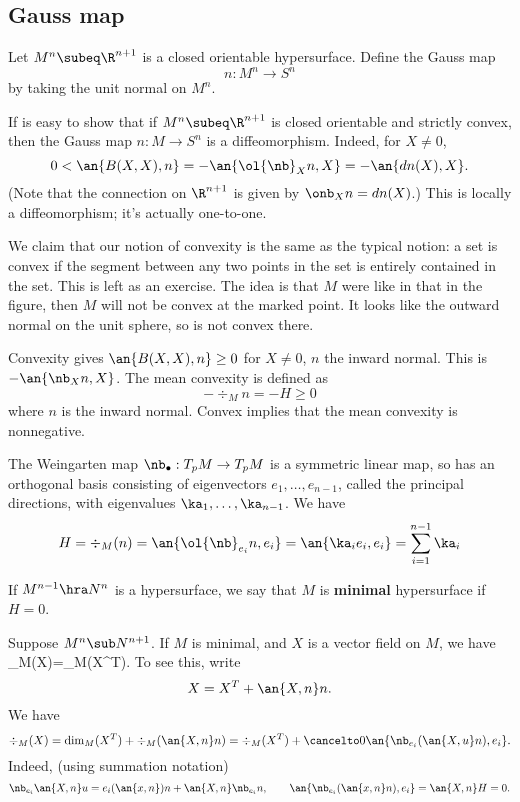 \subsection{Gauss map}
Let $M^n\subeq \R^{n+1}$ is a closed orientable hypersurface. 
Define the Gauss map
\[
n: M^n\to S^n
\]
by taking the unit normal %
on $M^n$.


If is easy to show that if $M^n\subeq \R^{n+1}$ is closed orientable and strictly convex, then the Gauss map $n:M\to S^n$ is a diffeomorphism. Indeed, for $X\ne 0$,
\[
0<\an{B(X,X),n}=-\an{\ol{\nb}_X n,X}=-\an{dn(X),X}.
\]
(Note that the connection on $\R^{n+1}$ is given by $\onb_{X}n=dn(X)$.) 
This is locally a diffeomorphism; it's actually one-to-one. 

We claim that our notion of convexity is the same as the typical notion: a set is convex if the segment between any two points in the set is entirely contained in the set. This is left as an exercise. The idea is that $M$ were like in that in the figure, then $M$ will not be convex at the marked point. It looks like the outward normal on the unit sphere, so is not convex there. 


Convexity gives $\an{B(X,X),n}\ge 0$ for $X\ne 0$, $n$ the inward normal. This is $-\an{\nb_X n,X}$. The mean convexity is defined as 
\[
-\div_M n =-H\ge 0
\]
where $n$ is the inward normal. Convex implies that the mean convexity is nonnegative. 

The Weingarten map $\nb_{\bullet}:T_pM\to T_pM$ is a symmetric linear map, so has an orthogonal basis consisting of eigenvectors $e_1,\ldots, e_{n-1}$, called the principal directions, with eigenvalues $\ka_1,\ldots,\ka_{n-1}$. We have 
\[
H=\div_M(n)=\an{\ol{\nb}_{e_i}n,e_i}=\an{\ka_ie_i,e_i} = \sum_{i=1}^{n-1} \ka_i
\]
\begin{df}
If $M^{n-1}\hra N^n$ is a hypersurface, we say that $M$ is \textbf{minimal} hypersurface if $H=0$.
\end{df}

Suppose $M^n\sub N^{n+1}$. If $M$ is minimal, and $X$ is a vector field on $M$, we have
\div_M(X)=\div_M(X^T).
\eeq
To see this, write
\[
X=X^T+\an{X,n}n.
\]
We have
\[
\div_M (X)=\dim_M(X^T) + \div_M(\an{X,n}n)
=
\div_M(X^T)+\cancelto0{\an{\nb_{e_i}(\an{X,u} n),e_i}}.
\]
Indeed, (using summation notation)
\[
\nb_{e_i} \an{X,n}u=e_i(\an{x,n})n+\an{X,n} \nb_{e_i}n,\qquad \an{\nb_{e_i} (\an{x,n}n),e_i}=\an{X,n} H=0.
\]

